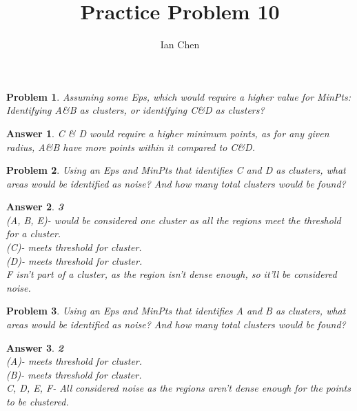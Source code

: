 \documentclass[11pt]{article}
\author{Ian Chen}
\title{Practice Problem 10}
\theoremstyle{description}
\newtheorem{problem}{Problem}
\theoremstyle{break}
\newtheorem*{answer}{Answer}
\begin{document}
    \maketitle

    \begin{problem}
        Assuming some Eps, which would require a higher value for MinPts:\\
        Identifying A\&B as clusters, or identifying C\&D as clusters?
    \end{problem}
    \begin{answer}
        C \& D would require a higher minimum points, as for any given radius,
        A\&B have more points within it compared to C\&D.
    \end{answer}

    \begin{problem}
        Using an Eps and MinPts that identifies C and D as clusters,
        what areas would be identified as noise?
        And how many total clusters would be found?
    \end{problem}
    \begin{answer}
        \textbf{3}\\
        (A, B, E)- would be considered one cluster as all the regions meet
        the threshold for a cluster.\\
        (C)- meets threshold for cluster.\\
        (D)- meets threshold for cluster.\\
        F isn't part of a cluster, as the region isn't dense enough, so it'll be
        considered noise.
    \end{answer}

    \begin{problem}
        Using an Eps and MinPts that identifies A and B as clusters,
        what areas would be identified as noise?
        And how many total clusters would be found?
    \end{problem}
    \begin{answer}
        \textbf{2}\\
        (A)- meets threshold for cluster.\\
        (B)- meets threshold for cluster.\\
        C, D, E, F- All considered noise as the regions aren't dense enough for
        the points to be clustered.
    \end{answer}
\end{document}
